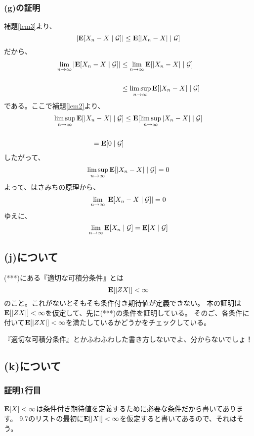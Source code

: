       \subsubsection{(g)の証明}
        補題\ref{lem3}より、
        \[
          |{\mathbf{E}}[X_n - X \mid \mathcal{G}]| \leq {\mathbf{E}}[|X_n - X| \mid \mathcal{G}]
        \]
        だから、
        \begin{align*}
          \lim_{n \to \infty}|{\mathbf{E}}[X_n - X \mid \mathcal{G}]|
          &\leq
          \lim_{n \to \infty}{\mathbf{E}}[|X_n - X| \mid \mathcal{G}]\\
          \\
          &\leq \limsup_{n \to \infty}{\mathbf{E}}[|X_n - X| \mid \mathcal{G}]
        \end{align*}
        である。ここで補題\ref{lem2}より、
        \begin{align*}
          \limsup_{n \to \infty}{\mathbf{E}}[|X_n - X| \mid \mathcal{G}]
          &\leq
          {\mathbf{E}}[\limsup_{n \to \infty}|X_n - X| \mid \mathcal{G}]\\
          \\
          = {\mathbf{E}}[0 \mid \mathcal{G}]\\
        \end{align*}
        したがって、
        \[
          \limsup_{n \to \infty}{\mathbf{E}}[|X_n - X| \mid \mathcal{G}] = 0
        \]
        よって、はさみちの原理から、
        \[
          \lim_{n \to \infty}|{\mathbf{E}}[X_n - X \mid \mathcal{G}]| = 0
        \]
        ゆえに、
        \[
          \lim_{n \to \infty}{\mathbf{E}}[X_n \mid \mathcal{G}] = {\mathbf{E}}[X \mid \mathcal{G}]
        \]

    \subsection{(j)について}
      (***)にある『適切な可積分条件』とは
      \[
        {\mathbf{E}}[|ZX|] < \infty
      \]
      のこと。これがないとそもそも条件付き期待値が定義できない。
      本の証明は${\mathbf{E}}[|ZX|] < \infty$を仮定して、先に(***)の条件を証明している。
      そのご、各条件に付いて${\mathbf{E}}[|ZX|] < \infty$を満たしているかどうかをチェックしている。

      『適切な可積分条件』とかふわふわした書き方しないでよ、分からないでしょ！

    \subsection{(k)について}
      \subsubsection{証明1行目}
        ${\mathbf{E}}[X] < \infty$は条件付き期待値を定義するために必要な条件だから書いてあります。
        9.7のリストの最初に${\mathbf{E}}[|X|] < \infty$を仮定すると書いてあるので、それはそう。

